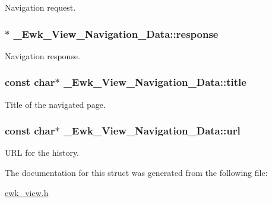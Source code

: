 Navigation request. \hypertarget{struct__Ewk__View__Navigation__Data_aa05f408543da80e01d489f31aeb5f9d5}{
\subsubsection[{response}]{$\ast$ \+\_\+\+Ewk\+\_\+\+View\+\_\+\+Navigation\+\_\+\+Data\+::response}}\label{struct__Ewk__View__Navigation__Data_aa05f408543da80e01d489f31aeb5f9d5}
Navigation response. \hypertarget{struct__Ewk__View__Navigation__Data_ad357114e7c98066aa62f552be9759c78}{
\subsubsection[{title}]{\setlength{\rightskip}{0pt plus 5cm}const char$\ast$ \+\_\+\+Ewk\+\_\+\+View\+\_\+\+Navigation\+\_\+\+Data\+::title}}\label{struct__Ewk__View__Navigation__Data_ad357114e7c98066aa62f552be9759c78}
Title of the navigated page. \hypertarget{struct__Ewk__View__Navigation__Data_a92f35de2b87fda899ae4df41fdc0b61c}{
\subsubsection[{url}]{\setlength{\rightskip}{0pt plus 5cm}const char$\ast$ \+\_\+\+Ewk\+\_\+\+View\+\_\+\+Navigation\+\_\+\+Data\+::url}}\label{struct__Ewk__View__Navigation__Data_a92f35de2b87fda899ae4df41fdc0b61c}
U\+R\+L for the history. 

The documentation for this struct was generated from the following file\+:\begin{DoxyCompactItemize}
\item 
\hyperlink{ewk__view_8h}{ewk\+\_\+view.\+h}\end{DoxyCompactItemize}
